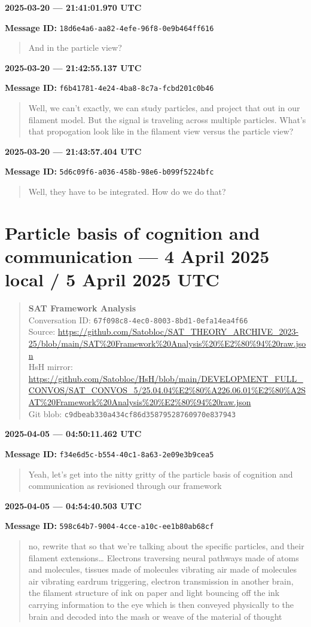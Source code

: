 \documentclass[11pt,letterpaper]{article}
\newcommand{\messageentry}[2]{%
  \Needspace{5\baselineskip}
  \medskip
  {\large\bfseries #1\par}
  {\small\textbf{Message ID:} \texttt{#2}\par}
}
\begin{document}
\messageentry{2025-03-20 --- 21:41:01.970 UTC}{18d6e4a6-aa82-4efe-96f8-0e9b464ff616}
\begin{quote}\small
And in the particle view?
\end{quote}

\messageentry{2025-03-20 --- 21:42:55.137 UTC}{f6b41781-4e24-4ba8-8c7a-fcbd201c0b46}
\begin{quote}\small
Well, we can't exactly, we can study particles, and project that out in our filament model. 
But the signal is traveling across multiple particles. What's that propogation look like in the filament view versus the particle view?
\end{quote}

\messageentry{2025-03-20 --- 21:43:57.404 UTC}{5d6c09f6-a036-458b-98e6-b099f5224bfc}
\begin{quote}\small
Well, they have to be integrated. How do we do that?
\end{quote}

\section*{Particle basis of cognition and communication --- 4 April 2025 local / 5 April 2025 UTC}
\begin{quote}\small
\textbf{SAT Framework Analysis}\\
Conversation ID: \texttt{67f098c8-4ec0-8003-8bd1-0efa14ea4f66}\\
Source: \url{https://github.com/Satobloc/SAT_THEORY_ARCHIVE_2023-25/blob/main/SAT%20Framework%20Analysis%20%E2%80%94%20raw.json}\\
HsH mirror: \url{https://github.com/Satobloc/HsH/blob/main/DEVELOPMENT_FULL_CONVOS/SAT_CONVOS_5/25.04.04%E2%80%A226.06.01%E2%80%A2SAT%20Framework%20Analysis%20%E2%80%94%20raw.json}\\
Git blob: \texttt{c9dbeab330a434cf86d35879528760970e837943}
\end{quote}

\messageentry{2025-04-05 --- 04:50:11.462 UTC}{f34e6d5c-b554-40c1-8a63-2e09e3b9cea5}
\begin{quote}\small
Yeah, let’s get into the nitty gritty of the particle basis of cognition and communication as revisioned through our framework
\end{quote}

\messageentry{2025-04-05 --- 04:54:40.503 UTC}{598c64b7-9004-4cce-a10c-ee1b80ab68cf}
\begin{quote}\small
no, rewrite that so that we’re talking about the specific particles, and their filament extensions… Electrons traversing neural pathways made of atoms and molecules, tissues made of molecules vibrating air made of molecules air vibrating eardrum triggering, electron transmission in another brain, the filament structure of ink on paper and light bouncing off the ink carrying information to the eye which is then conveyed physically to the brain and decoded into the mash or weave of the material of thought
\end{quote}
\end{document}
